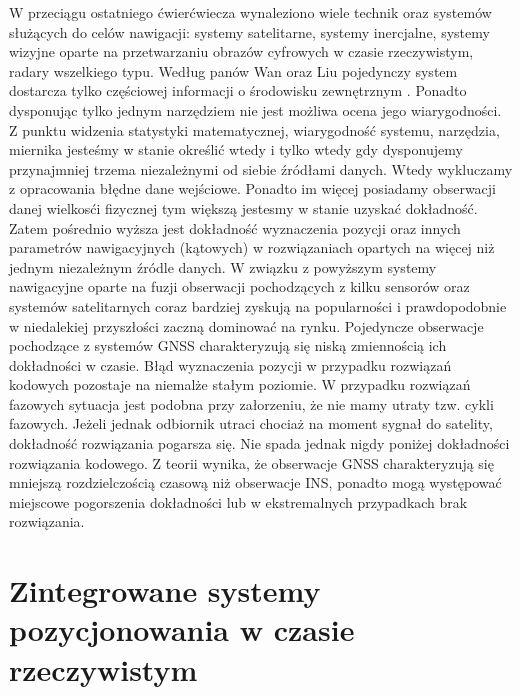 W przeciągu ostatniego ćwierćwiecza wynaleziono wiele technik oraz systemów służących do celów nawigacji: systemy satelitarne, systemy inercjalne,
systemy wizyjne oparte na przetwarzaniu obrazów cyfrowych w czasie rzeczywistym, radary wszelkiego typu.
Według panów Wan oraz Liu pojedynczy system dostarcza tylko częściowej informacji o środowisku zewnętrznym \cite[][strona 770]{CCTA_769_775}.
Ponadto dysponując tylko jednym narzędziem nie jest możliwa ocena jego wiarygodności. Z punktu widzenia statystyki matematycznej,
wiarygodność systemu, narzędzia, miernika jesteśmy w stanie określić wtedy i tylko wtedy gdy dysponujemy przynajmniej trzema niezależnymi od siebie źródłami danych.
Wtedy wykluczamy z opracowania błędne dane wejściowe. Ponadto im więcej posiadamy obserwacji danej wielkosći fizycznej tym większą jestesmy w stanie uzyskać dokładność.
Zatem pośrednio wyższa jest dokładność wyznaczenia pozycji oraz innych parametrów nawigacyjnych (kątowych)
w rozwiązaniach opartych na więcej niż jednym niezależnym źródle danych. W związku z powyższym systemy nawigacyjne oparte na fuzji obserwacji
pochodzących z kilku sensorów oraz systemów satelitarnych coraz bardziej zyskują na popularności \cite[][strona 770]{CCTA_769_775}
i prawdopodobnie w niedalekiej przyszłości zaczną dominować na rynku.
Pojedyncze obserwacje pochodzące z systemów GNSS charakteryzują się niską zmiennością ich dokładności w czasie.
Błąd wyznaczenia pozycji w przypadku rozwiązań kodowych pozostaje na niemalże stałym poziomie. 
W przypadku rozwiązań fazowych sytuacja jest podobna przy załorzeniu, że nie mamy utraty tzw. cykli fazowych.
Jeżeli jednak odbiornik utraci chociaż na moment sygnał do satelity, dokładność rozwiązania pogarsza się.
Nie spada jednak nigdy poniżej dokładności rozwiązania kodowego. Z teorii wynika,
że obserwacje GNSS charakteryzują się mniejszą rozdzielczością czasową niż obserwacje INS,
ponadto mogą występować miejscowe pogorszenia dokładności lub w ekstremalnych przypadkach brak rozwiązania.
\section{Zintegrowane systemy pozycjonowania w czasie rzeczywistym}
